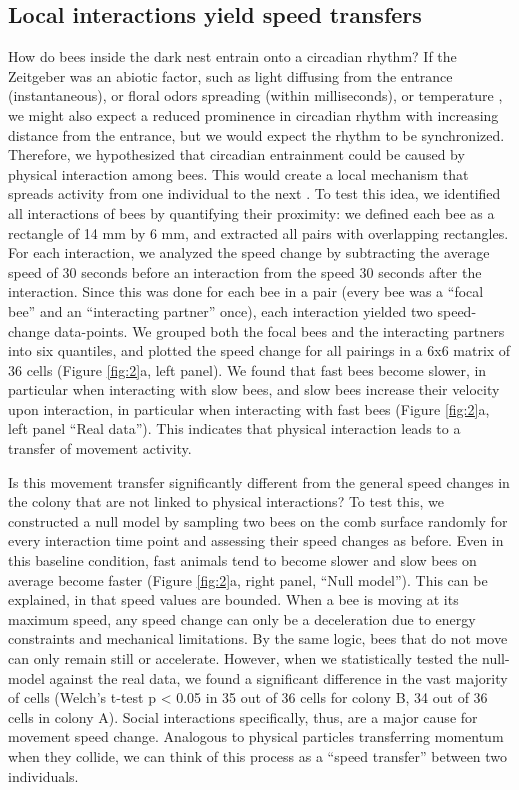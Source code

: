 \documentclass{article}
\begin{document}
\subsection{Local interactions yield speed transfers}
How do bees inside the dark nest entrain onto a circadian rhythm? If the Zeitgeber was an abiotic factor, such as light diffusing from the entrance (instantaneous), or floral odors spreading (within milliseconds), or temperature \cite{jhawar_how_2023}, we might also expect a reduced prominence in circadian rhythm with increasing distance from the entrance, but we would expect the rhythm to be synchronized. Therefore, we hypothesized that circadian entrainment could be caused by physical interaction among bees. This would create a local mechanism that spreads activity from one individual to the next \cite{vicsek_collective_2012}. To test this idea, we identified all interactions of bees by quantifying their proximity: we defined each bee as a rectangle of 14 mm by 6 mm, and extracted all pairs with overlapping rectangles. For each interaction, we analyzed the speed change by subtracting the average speed of 30 seconds before an interaction from the speed 30 seconds after the interaction. Since this was done for each bee in a pair (every bee was a “focal bee” and an “interacting partner” once), each interaction yielded two speed-change data-points. We grouped both the focal bees and the interacting partners into six quantiles, and plotted the speed change for all pairings in a 6x6 matrix of 36 cells (Figure \ref{fig:2}a, left panel). We found that fast bees become slower, in particular when interacting with slow bees, and slow bees increase their velocity upon interaction, in particular when interacting with fast bees (Figure \ref{fig:2}a, left panel “Real data”). This indicates that physical interaction leads to a transfer of movement activity.   

Is this movement transfer significantly different from the general speed changes in the colony that are not linked to physical interactions? To test this, we constructed a null model by sampling two bees on the comb surface randomly for every interaction time point and assessing their speed changes as before. Even in this baseline condition, fast animals tend to become slower and slow bees on average become faster (Figure \ref{fig:2}a, right panel, “Null model”). This can be explained, in that speed values are bounded. When a bee is moving at its maximum speed, any speed change can only be a deceleration due to energy constraints and mechanical limitations. By the same logic, bees that do not move can only remain still or accelerate. However, when we statistically tested the null-model against the real data, we found a significant difference in the vast majority of cells (Welch’s t-test p < 0.05 in 35 out of 36 cells for colony B, 34 out of 36 cells in colony A). Social interactions specifically, thus, are a major cause for movement speed change. Analogous to physical particles transferring momentum when they collide, we can think of this process as a “speed transfer” between two individuals. 
\end{document}
